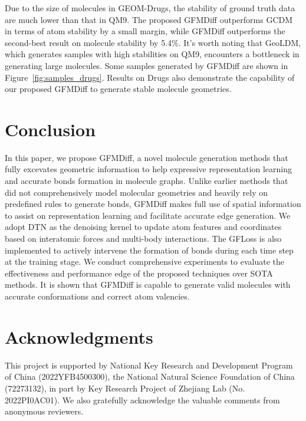 \documentclass[letterpaper]{article} %
\begin{document}
Due to the size of molecules in GEOM-Drugs, the stability of ground truth data are much lower than that in QM9. The proposed GFMDiff outperforms GCDM in terms of atom stability by a small margin, while GFMDiff outperforms the second-best result on molecule stability by 5.4\%. It's worth noting that GeoLDM, which generates samples with high stabilities on QM9, encounters a bottleneck in generating large molecules. Some samples generated by GFMDiff are shown in Figure~\ref{fig:samples_drugs}. Results on Drugs also demonstrate the capability of our proposed GFMDiff to generate stable molecule geometries.

\section{Conclusion}
In this paper, we propose GFMDiff, a novel molecule generation methods that fully excevates geometric information to help expressive representation learning and accurate bonds formation in molecule graphs. Unlike earlier methods that did not comprehensively model molecular geometries and heavily rely on predefined rules to generate bonds, GFMDiff makes full use of spatial information to assist on representation learning and facilitate accurate edge generation. We adopt DTN as the denoising kernel to update atom features and coordinates based on interatomic forces and multi-body interactions. The GFLoss is also implemented to actively intervene the formation of bonds during each time step at the training stage. We conduct comprehensive experiments to evaluate the effectiveness and performance edge of the proposed techniques over SOTA methods. It is shown that GFMDiff is capable to generate valid molecules with accurate conformations and correct atom valencies. 


\section{Acknowledgments}
This project is supported by National Key Research and Development Program of China (2022YFB4500300), the National Natural Science Foundation of China (72273132), in part by Key Research Project of Zhejiang Lab (No. 2022PI0AC01). We also gratefully acknowledge the valuable comments from anonymous reviewers.



\end{document}
